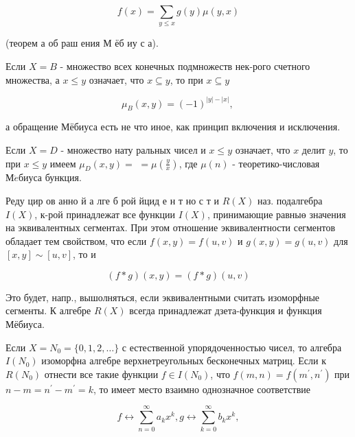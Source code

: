 \documentclass[10pt]{article}
\begin{document}
\[

f(x)=\sum_{y \leqslant x} g(y) \mu(y, x)

\]



(теорем а об раш ения М ёб иу с а).



Если $X=B$ - множество всех конечных подмножеств нек-рого счетного множества, а $x \leqslant y$ означает, что $x \subseteq y$, то при $x \subseteq y$



\[

\mu_{B}(x, y)=(-1)^{|y|-|x|} \text {, }

\]



а обращение Мёбиуса есть не что иное, как принцип включения и исключения.



Если $X=D$ - множество нату ральных чисел и $x \leqslant y$ означает, что $x$ делит $y$, то при $x \leqslant y$ имеем $\mu_{D}(x, y)=$ $=\mu\left(\frac{y}{x}\right)$, где $\mu(n)$ - теоретико-числовая $М \ddot{e} б и у с а$ бункция.



Реду цир ов анно й а лге б рой йцид е н т но с т и $R(X)$ наз. подалгебра $I(X)$, к-рой принадлежат все функции $I(X)$, принимающие равныө значения на эквивалентных сегментах. При этом отношение эквивалентности сегментов обладает тем свойством, что если $f(x, y)=f(u, v)$ и $g(x, y)=g(u, v)$ для $[x, y] \sim[u, v]$, то и



\[

(f * g)(x, y)=(f * g)(u, v)

\]



Это будет, напр., вышолняться, если эквивалентными считать изоморфные сегменты. $К$ алгебре $R(X)$ всегда принадлежат дзета-функция и функция Мёбиуса.



Если $X=N_{0}=\{0,1,2, \ldots\}$ с естественной упорядоченностью чисел, то алгебра $I\left(N_{0}\right)$ изоморфна алгебре верхнетреугольных бесконечных матриц. Если к $R\left(N_{0}\right)$ отнести все такие функции $f \in I\left(N_{0}\right)$, что $f(m, n)=f\left(m^{\prime}, n^{\prime}\right)$ при $n-m=n^{\prime}-m^{\prime}=k$, то имеет место взаимно однозначное соответствие



\[

f \leftrightarrow \sum_{n=0}^{\infty} a_{k} x^{k}, g \leftrightarrow \sum_{k=0}^{\infty} b_{k} x^{k},

\]
\end{document}
